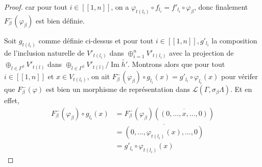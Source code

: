 \documentclass[a4paper,10pt]{article}
\DeclareMathOperator{\Img}{Im}
\begin{document}
\begin{proof}
 car pour tout $i \in [\![1,n]\!]$, on a $\varphi_{t(l_{i})} \circ f_{l_{i}} = f'_{l_{i}} \circ \varphi_{\beta} $, donc finalement $F_{\beta}^{-}(\varphi_{\beta})$ est bien définie.


Soit $g_{t(l_{i})}$ comme définie ci-dessus et  pour tout  $i\in[\![1,n]\!],g'_{l_{i}}$ la composition de l'inclusion naturelle de $V'_{t(l_{i})}$ dans $\oplus_{i = 1}^{n} V'_{t(l_{i})}$ avec la projection de $\oplus_{l \in \Gamma^{\beta}} V'_{t(l)}$ dans $\oplus_{l \in \Gamma^{\beta}} V'_{t(l)} / \Img \tilde{h'}$. Montrons alors que pour tout $i \in [\![1,n]\!]$ et $x \in V_{t(l_{i})}$, on ait $F^{-}_{\beta}(\varphi_{\beta}) \circ g_{l_{i}}(x)  = g'_{l_{i}} \circ \varphi_{l_{i}}(x)$ pour vérifer que $F_{\beta}^{-}(\varphi)$ est bien un morphisme de représentation dans $\mathscr L(\Gamma,\sigma_{\beta}\Lambda)$. Et en effet, 
\[
\begin{array}{ll}
  F^{-}_{\beta}(\varphi_{\beta}) \circ g_{l_{i}}(x) &= F^{-}_{\beta}(\varphi_{\beta})(\overline{(0, \dots, x, \dots, 0)}) \\
                                                    &= \overline{(0, \dots, \varphi_{t(l_{i})}(x),\dots,0)} \\
                                                    &= g'_{l_{i}} \circ \varphi_{t(l_{i})}(x)
\end{array}
\] 


 
\end{proof}
\end{document}
